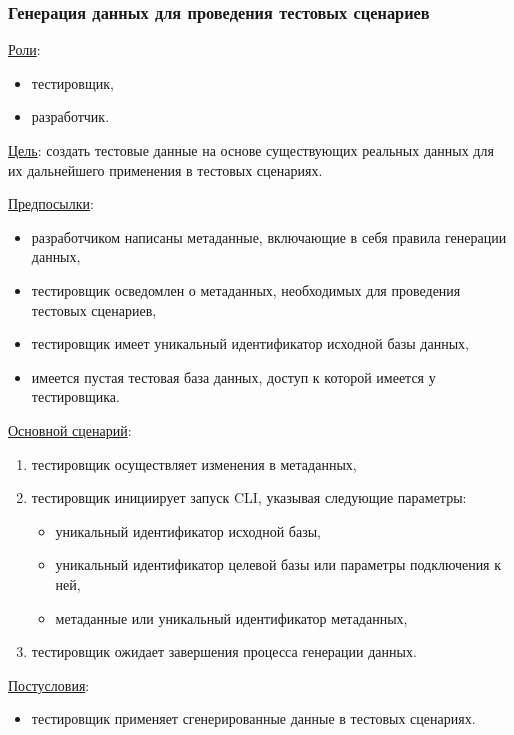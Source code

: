 \subsubsection{Генерация данных для проведения тестовых сценариев}

\underline{Роли}:

\begin{itemize}
    \item тестировщик,
    \item разработчик.
\end{itemize}

\underline{Цель}: создать тестовые данные на основе существующих реальных данных для их дальнейшего применения в тестовых сценариях.

\underline{Предпосылки}:

\begin{itemize}
    \item разработчиком написаны метаданные, включающие в себя правила генерации данных,
    \item тестировщик осведомлен о метаданных, необходимых для проведения тестовых сценариев,
    \item тестировщик имеет уникальный идентификатор исходной базы данных,
    \item имеется пустая тестовая база данных, доступ к которой имеется у тестировщика.
\end{itemize}

\underline{Основной сценарий}:

\begin{enumerate}
    \item тестировщик осуществляет изменения в метаданных,
    \item тестировщик инициирует запуск CLI, указывая следующие параметры:
    \begin{itemize}
        \item уникальный идентификатор исходной базы,
        \item уникальный идентификатор целевой базы или параметры подключения к ней,
        \item метаданные или уникальный идентификатор метаданных,
    \end{itemize}
    \item тестировщик ожидает завершения процесса генерации данных.
\end{enumerate}

\underline{Постусловия}:

\begin{itemize}
    \item тестировщик применяет сгенерированные данные в тестовых сценариях.
\end{itemize}


